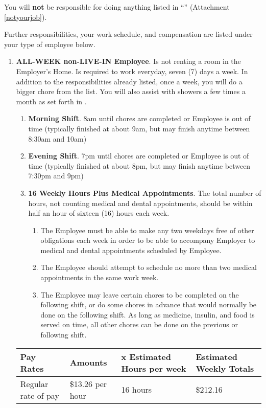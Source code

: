 \documentclass[]{article}
\newcommand{\allweek}{ALL-WEEK non-LIVE-IN Employee}
\begin{document}
You will \textbf{not} be responsible for doing anything listed in ``\notyourjob{}'' (Attachment \ref{notyourjob}). 

Further responsibilities, your work schedule, and compensation are listed under your type of employee below.
\begin{enumerate}
	\item \textbf{\allweek{}}. Is not renting a room in the Employer's Home. Is required to work everyday, seven (7) days a week. In addition to the responsibilities already listed, once a week, you will do a bigger chore from the \bigchores{} list. You will also assist with showers a few times a month as set forth in \shower{}. 
		\begin{enumerate}
			\item \textbf{Morning Shift}. 8am until chores are completed or Employee is out of time (typically finished at about 9am, but may finish anytime between 8:30am and 10am)
			\item \textbf{Evening Shift}. 7pm until chores are completed or Employee is out of time (typically finished at about 8pm, but may finish anytime between 7:30pm and 9pm)
			\item \textbf{16 Weekly Hours Plus Medical Appointments}. The total number of hours, not counting medical and dental appointments, should be within half an hour of sixteen (16) hours each week. 
				\begin{enumerate}
					\item The Employee must be able to make any two weekdays free of other obligations each week in order to be able to accompany Employer to medical and dental appointments scheduled by Employee.
					\item The Employee should attempt to schedule no more than two medical appointments in the same work week.
					\item The Employee may leave certain chores to be completed on the following shift, or do some chores in advance that would normally be done on the following shift. As long as medicine, insulin, and food is served on time, all other chores can be done on the previous or following shift.
				\end{enumerate}
		\end{enumerate}
		\begin{tabular}{|p{}|l|l|p{}|}
			\hline
			Pay Rates & Amounts & x Estimated Hours per week & Estimated Weekly Totals\\ \hline
			Regular rate of pay & \$13.26 per hour & 16 hours & \$212.16\\ \hline

\end{tabular}
\end{enumerate}
\end{document}
